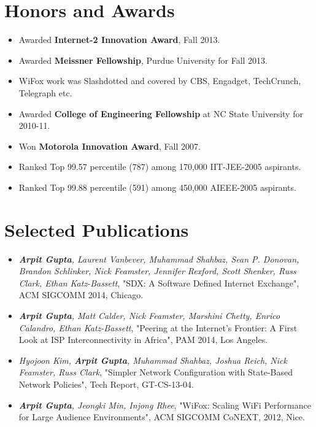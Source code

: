 \documentclass[11pt]{res}
\begin{document}
\begin{resume}
\section{{Honors and Awards}}
\begin{itemize} \itemsep -2pt
\item Awarded \textbf{Internet-2 Innovation Award}, Fall 2013.
\item Awarded \textbf{Meissner Fellowship}, Purdue University for Fall 2013.
\item WiFox work was Slashdotted and covered by CBS, Engadget, TechCrunch, Telegraph etc.
\item Awarded \textbf {College of Engineering Fellowship} at NC State University for 2010-11.
\item Won \textbf{Motorola Innovation Award}, Fall 2007.
\item Ranked Top 99.57 percentile (787) among 170,000 IIT-JEE-2005 aspirants.
\item Ranked Top 99.88 percentile (591) among 450,000 AIEEE-2005 aspirants.
\end{itemize}

\section{{Selected Publications}}
\begin{itemize} \itemsep -2pt
\item \textit {\textbf{Arpit Gupta}, Laurent Vanbever, Muhammad Shahbaz, Sean P. Donovan, Brandon Schlinker, Nick Feamster, Jennifer Rexford, Scott Shenker, Russ Clark, Ethan Katz-Bassett}, "SDX: A Software Defined Internet Exchange", ACM SIGCOMM 2014, Chicago.
\item \textit {\textbf{Arpit Gupta}, Matt Calder, Nick Feamster, Marshini Chetty, Enrico Calandro, Ethan Katz-Bassett}, "Peering at the Internet’s Frontier: A First Look at ISP Interconnectivity in Africa", PAM 2014, Los Angeles.
\item \textit {Hyojoon Kim, \textbf{Arpit Gupta}, Muhammad Shahbaz, Joshua Reich, Nick Feamster, Russ Clark}, "Simpler Network Configuration with State-Based Network Policies", Tech Report, GT-CS-13-04.
\item \textit {\textbf{Arpit Gupta}, Jeongki Min, Injong Rhee}, "WiFox: Scaling WiFi Performance for Large Audience Environments", ACM SIGCOMM CoNEXT, 2012, Nice.


\end{itemize}
\end{resume}
\end{document}
